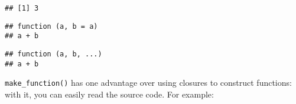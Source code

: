 \begin{Shaded}
\begin{Highlighting}[]
\NormalTok{(}\NormalTok{, }\NormalTok{)}
\end{Highlighting}
\end{Shaded}

\begin{verbatim}
## [1] 3
\end{verbatim}

\begin{Shaded}
\begin{Highlighting}[]
\NormalTok{(}\NormalTok{(}\NormalTok{ , }\OperatorTok{+}\StringTok{ }
\end{Highlighting}
\end{Shaded}

\begin{verbatim}
## function (a, b = a) 
## a + b
\end{verbatim}

\begin{Shaded}
\begin{Highlighting}[]
\NormalTok{(}\NormalTok{(}\NormalTok{ , }\NormalTok{ , }\NormalTok{), }\OperatorTok{+}\StringTok{ }
\end{Highlighting}
\end{Shaded}

\begin{verbatim}
## function (a, b, ...) 
## a + b
\end{verbatim}

\texttt{make\_function()} has one advantage over using closures to
construct functions: with it, you can easily read the source code. For
example:

\begin{Shaded}
\begin{Highlighting}[]
\StringTok{ }
  \NormalTok{(}\NormalTok{(}\NormalTok{), }\OperatorTok{+}\StringTok{ }\NormalTok{())}
\NormalTok{\}}
\NormalTok{(}\NormalTok{)}
\end{Highlighting}
\end{Shaded}

